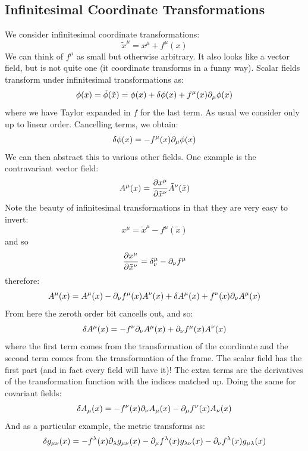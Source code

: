 \subsection{Infinitesimal Coordinate Transformations}
We consider infinitesimal coordinate transformations:
\begin{equation}
    \tilde{x}^\mu = x^\mu + f^\mu(x)
\end{equation}
We can think of $f^\mu$ as small but otherwise arbitrary. It also looks like a vector field, but is not quite one (it coordinate transforms in a funny way). Scalar fields transform under infinitesimal transformations as:
\begin{equation}
    \varphi(x) = \tilde{\varphi}(\tilde{x}) = \varphi(x) + \delta \varphi(x) + f^\mu(x)\p_\mu\varphi(x)
\end{equation}
where we have Taylor expanded in $f$ for the last term. As usual we consider only up to linear order. Cancelling terms, we obtain:
\begin{equation}
    \delta \phi(x) = -f^\mu(x)\p_\mu\phi(x)
\end{equation}
We can then abstract this to various other fields. One example is the contravariant vector field:
\begin{equation}
    A^\mu(x) = \frac{\partial x^\mu}{\partial \tilde{x}^\nu}\tilde{A}^{\nu}(\tilde{x})
\end{equation}
Note the beauty of infinitesimal transformations in that they are very easy to invert:
\begin{equation}
    x^\mu = \tilde{x}^\mu - f^\mu(\tilde{x})
\end{equation}
and so
\begin{equation}
    \frac{\partial x^\mu}{\partial \tilde{x}^\nu} = \delta^\mu_\nu - \partial_\nu f^\mu
\end{equation}
therefore:
\begin{equation}
    A^\mu(x) = A^\mu(x) - \partial_\nu f^{\mu}(x)A^\nu(x) + \delta A^\mu(x) + f^\nu(x)\partial_\nu A^\mu(x)
\end{equation}
From here the zeroth order bit cancells out, and so:
\begin{equation}
    \delta A^\mu(x) = -f^\nu\partial_\nu A^\mu(x) + \partial_\nu f^\mu(x)A^\nu(x)
\end{equation}
where the first term comes from the transformation of the coordinate and the second term comes from the transformation of the frame. The scalar field has the first part (and in fact every field will have it)! The extra terms are the derivatives of the transformation function with the indices matched up. Doing the same for covariant fields:
\begin{equation}
    \delta A_\mu(x) = -f^\nu(x)\partial_\nu A_\mu(x) - \partial_\mu f^\nu(x) A_\nu(x)
\end{equation}
And as a particular example, the metric transforms as:
\begin{equation}
    \delta g_{\mu\nu}(x)=  - f^\lambda(x)\partial_\lambda g_{\mu\nu}(x) - \partial_\mu f^\lambda(x) g_{\lambda \nu}(x) - \partial_\nu f^\lambda(x) g_{\mu\lambda}(x)
\end{equation}

